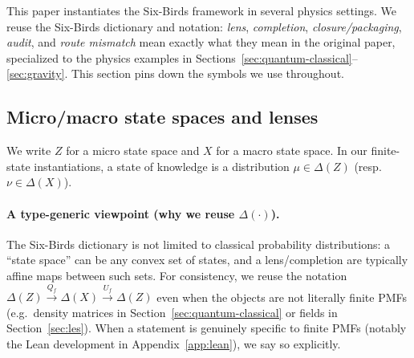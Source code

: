 \documentclass[11pt]{article}
\providecommand{\Z}{Z}
\providecommand{\X}{X}
\providecommand{\Dist}[1]{\Delta(#1)}
\providecommand{\Qf}{Q_f}
\providecommand{\Uf}{U_f}
\begin{document}
This paper instantiates the Six-Birds framework \citep{SixBirdsFramework} in several physics settings. We reuse the Six-Birds dictionary and notation: \emph{lens}, \emph{completion}, \emph{closure/packaging}, \emph{audit}, and \emph{route mismatch} mean exactly what they mean in the original paper, specialized to the physics examples in Sections~\ref{sec:quantum-classical}--\ref{sec:gravity}. This section pins down the symbols we use throughout.

\subsection{Micro/macro state spaces and lenses}
We write $\Z$ for a micro state space and $\X$ for a macro state space. In our finite-state instantiations, a state of knowledge is a distribution $\mu \in \Dist{\Z}$ (resp.\ $\nu \in \Dist{\X}$).

\paragraph{A type-generic viewpoint (why we reuse $\Dist{\cdot}$).}
The Six-Birds dictionary is not limited to classical probability distributions: a ``state space'' can be any convex set of states, and a lens/completion are typically affine maps between such sets. For consistency, we reuse the notation
$\Dist{\Z}\xrightarrow{\Qf}\Dist{\X}\xrightarrow{\Uf}\Dist{\Z}$
even when the objects are not literally finite PMFs (e.g.\ density matrices in Section~\ref{sec:quantum-classical} or fields in Section~\ref{sec:les}). When a statement is genuinely specific to finite PMFs (notably the Lean development in Appendix~\ref{app:lean}), we say so explicitly.
\end{document}
